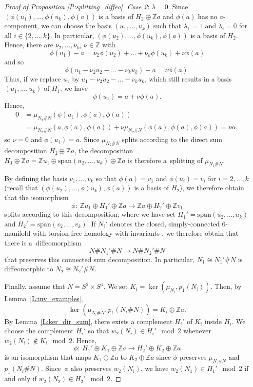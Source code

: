 \documentclass[10pt,a4paper]{amsart}
\numberwithin{equation}{section}
\theoremstyle{definition}
\numberwithin{table}{section}
\newcommand{\Z}{\mathbb{Z}}
\begin{document}
\begin{proof}[Proof of Proposition \ref{P:splitting_diffeo}]
\emph{Case 2}: $\lambda=0$. Since $(\phi(u_1),\dots,\phi(u_k),\phi(a))$ is a basis of $H_2\oplus\Z a$ and $\phi(a)$ has no $a$\nobreakdash-component, we can choose the basis $(u_1,\dots,u_k)$ such that $\lambda_1=1$ and $\lambda_i=0$ for all $i\in\{2,\dots,k\}$. In particular, $(\phi(u_2),\dots,\phi(u_k),\phi(a))$ is a basis of $H_2$. Hence, there are $\nu_2,\dots,\nu_k$, ${\nu\in\Z}$ with
		\[ \phi(u_1)-a=\nu_2\phi(u_2)+\dots+\nu_k\phi(u_k)+\nu\phi(a) \]
		and so
		\[ \phi(u_1-\nu_2 u_2 -\dots-\nu_k u_k )-a=\nu\phi(a). \]
		Thus, if we replace $u_1$ by $u_1-\nu_2 u_2 -\dots-\nu_k u_k$, which still results in a basis $(u_1,\dots,u_k)$ of $H_1$, we have
		\[ \phi(u_1)=a+\nu\phi(a). \]
Hence,
		\begin{align*}
        0&=\mu_{N_2\#N}(\phi(u_1),\phi(a),\phi(a))\\
        &=\mu_{N_2\#N}(a,\phi(a),\phi(a))+\nu\mu_{N_2\#N}(\phi(a),\phi(a),\phi(a))=\nu\alpha,
        \end{align*}
		so $\nu=0$ and $\phi(u_1)=a$. Since $\mu_{N_2\# N}$ splits according to the direct sum decomposition $H_2\oplus\Z a$, the decomposition $H_1\oplus \Z a=\Z u_1\oplus \mathrm{span}(u_2,\dots,u_k)\oplus \Z a$ is therefore a~splitting of $\mu_{N_1\# N}$.
		
		By defining the basis $v_1,\dots,v_k$ so that $\phi(a)=v_1$ and $\phi(u_i)=v_i$ for $i=2,\dots,k$ (recall that $(\phi(u_2),\dots,\phi(u_k),\phi(a))$ is a basis of $H_2$), we therefore obtain that the isomorphism
		\[ \phi\colon\ \Z u_1\oplus H_1'\oplus \Z a\to \Z a\oplus H_2'\oplus \Z v_1 \]
		splits according to this decomposition, where we have set $H_1'=\mathrm{span}(u_2,\dots,u_k)$ and $H_2'=\mathrm{span}(v_2,\dots,v_k)$. If $N_i'$ denotes the closed, simply-connected $6$-manifold with torsion-free homology with invariants , we therefore obtain that there is a~diffeomorphism
		\[ N\# N_1'\# N\to N\# N_2'\# N \]
		that preserves this connected sum decomposition. In particular, $N_1\cong N_1'\# N$ is diffeomorphic to $N_2\cong N_2'\# N$.
	
	Finally, assume that $N=S^2\times S^4$. We set $K_i=\ker(\mu_{N_i},p_1(N_i))$. Then, by Lemma~\ref{L:inv_examples},
	\[\ker(\mu_{N_i\# N},p_1(N_i\#N))=K_i\oplus\Z a.\]
	By Lemma~\ref{L:ker_dir_sum}, there exists a complement $H_i'$ of $K_i$ inside $H_i$. We choose the complement $H_i'$ so that $w_2(N_i)\in H_i'\mod 2$ whenever $w_2(N_i)\not\in K_i\mod 2$. Hence,
	\[ \phi\colon\ H_1'\oplus K_1\oplus\Z a\to H_2'\oplus K_2\oplus\Z a \]
	is an isomorphism that maps $K_1\oplus\Z a$ to $K_2\oplus\Z a$ since $\phi$ preserves $\mu_{N_i\# N}$ and $p_1(N_i\# N)$. Since~$\phi$ also preserves $w_2(N_i)$, we have $w_2(N_1)\in H_1'\mod 2$ if and only if $w_2(N_2)\in H_2'\mod 2$.
	

\end{proof}
\end{document}

